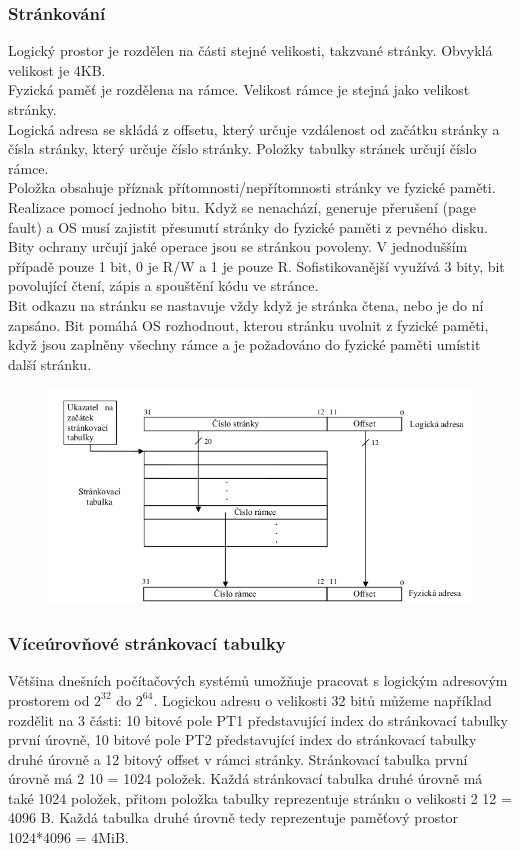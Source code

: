 \subsubsection*{Stránkování}
Logický prostor je rozdělen na části stejné velikosti, takzvané stránky. Obvyklá velikost je 4KB.\\
Fyzická paměť je rozdělena na rámce. Velikost rámce je stejná jako velikost stránky. \\
Logická adresa se skládá z offsetu, který určuje vzdálenost od začátku stránky a čísla stránky, který určuje číslo stránky. Položky tabulky stránek určují číslo rámce.\\
Položka obsahuje příznak přítomnosti/nepřítomnosti stránky ve fyzické paměti. Realizace pomocí jednoho bitu. Když se nenachází, generuje přerušení (page fault) a OS musí zajistit přesunutí stránky do fyzické paměti z pevného disku.\\
Bity ochrany určují jaké operace jsou se stránkou povoleny. V jednodušším případě pouze 1 bit, 0 je R/W a 1 je pouze R. Sofistikovanější využívá 3 bity, bit povolující čtení, zápis a spouštění kódu ve stránce. \\
Bit odkazu na stránku se nastavuje vždy když je stránka čtena, nebo je do ní zapsáno. Bit pomáhá OS rozhodnout, kterou stránku uvolnit z fyzické paměti, když jsou zaplněny všechny rámce a je požadováno do fyzické paměti umístit další stránku. \\
\begin{figure}[h!]
    \centering
    \includegraphics[scale = 0.5]{img/Strankovani.png}
\end{figure}

\subsubsection*{Víceúrovňové stránkovací tabulky}
Většina dnešních počítačových systémů umožňuje pracovat s logickým adresovým prostorem od $2^32$ do $2^64$.
Logickou adresu o velikosti 32 bitů můžeme například rozdělit na 3 části: 10 bitové pole PT1 představující index do stránkovací tabulky první úrovně, 10 bitové pole PT2 představující index do stránkovací tabulky druhé úrovně a 12 bitový offset v rámci stránky. Stránkovací tabulka první úrovně má 2 10 = 1024 položek. Každá stránkovací tabulka druhé úrovně má také 1024 položek, přitom položka tabulky reprezentuje stránku o velikosti 2 12 = 4096 B. Každá tabulka druhé úrovně tedy reprezentuje paměťový prostor 1024*4096 = 4MiB.

